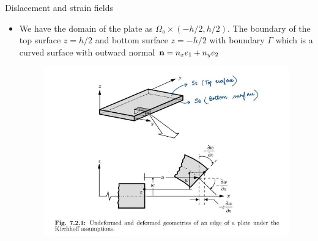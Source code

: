 	\begin{frame}{Dislacement and strain fields}
		\begin{itemize}
			\item We have the domain of the plate as $\Omega_o \times (-h/2,h/2)$. The boundary of the top surface $z = h/2$ and bottom surface $z = -h/2$ with boundary $\Gamma$ which is a curved surface with outward normal $\mathbf{n} = n_xe_1 + n_ye_2$
			\begin{figure}
				\centering
				\includegraphics[width=0.8 \linewidth]{Figure/fig30} 		
			\end{figure}
		\end{itemize}
	\end{frame}


